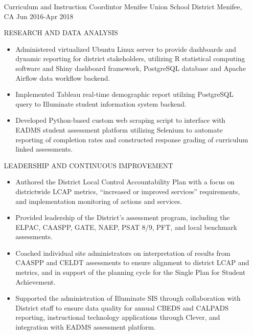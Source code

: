 \begin{cventries}
  \cventry
    {Curriculum and Instruction Coordintor} %
    {Menifee Union School District} %
    {Menifee, CA} %
    {Jun 2016-Apr 2018} %
    {
      \begin{cvitems} %
          \item RESEARCH AND DATA ANALYSIS
          \begin{itemize}
            \item {Administered virtualized Ubuntu Linux server to provide dashboards
            and dynamic reporting for district stakeholders, utilizing R statistical
            computing software and Shiny dashboard framework, PostgreSQL database and
            Apache Airflow data workflow backend.}
            \item {Implemented Tableau real-time demographic report utilzing PostgreSQL
            query to Illuminate student information system backend.}
            \item {Developed Python-based custom web scraping script to interface
            with EADMS student assessment platform utilizing Selenium to automate
            reporting of completion rates and constructed response grading of
            curriculum linked assessments.}
          \end{itemize}
          \item LEADERSHIP AND CONTINUOUS IMPROVEMENT
          \begin{itemize}
            \item {Authored the District Local Control Accountability Plan with a
            focus on districtwide LCAP metrics, “increased or improved services”
            requirements, and implementation monitoring of actions and services.}
            \item {Provided leadership of the District’s assessment program,
            including the ELPAC, CAASPP, GATE, NAEP, PSAT 8/9, PFT, and local
            benchmark assessments.}
            \item {Coached individual site administrators on interpretation of
            results from CAASPP and CELDT assessments to ensure alignment to district
            LCAP and metrics, and in support of the planning cycle for the Single
            Plan for Student Achievement.}
            \item {Supported the administration of Illuminate SIS through
            collaboration with District staff to ensure data quality for annual CBEDS
            and CALPADS reporting, instructional technology applications through
            Clever, and integration with EADMS assessment platform.}
          \end{itemize}
      \end{cvitems}
    }



\end{cventries}
